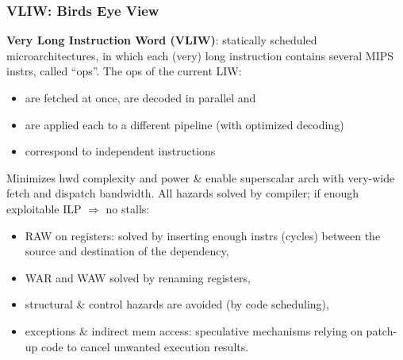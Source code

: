 \documentclass{beamer}
\begin{document}
\begin{frame}[fragile,t]
\frametitle{VLIW: Birds Eye View}

{\bf Very Long Instruction Word (VLIW)}: statically scheduled microarchitectures, 
        in which each (very) long instruction contains several MIPS instrs, 
        called ``{\sc ops}''.
    The {\sc ops} of the current LIW:\smallskip
\begin{itemize}
    \item are fetched at once, are decoded in parallel and 
    \item are applied each to a different pipeline (with optimized decoding)
    \item correspond to independent instructions
\end  {itemize}
\bigskip


\smallskip

%
Minimizes hwd complexity and power \& enable
    superscalar arch with very-wide fetch and dispatch bandwidth.
All hazards solved by compiler; if enough exploitable ILP $\Rightarrow$ no stalls:\pause
\begin{itemize}
    \item RAW on registers: solved by inserting enough instrs (cycles) 
            between the source and destination of the dependency,\smallskip
    \item WAR and WAW solved by renaming registers,
    \item structural \& control hazards are avoided (by code scheduling),
    \item exceptions \& indirect mem access: speculative mechanisms relying on
             patch-up code to cancel unwanted execution results.  
\end  {itemize}


\end{frame}
\end{document}
